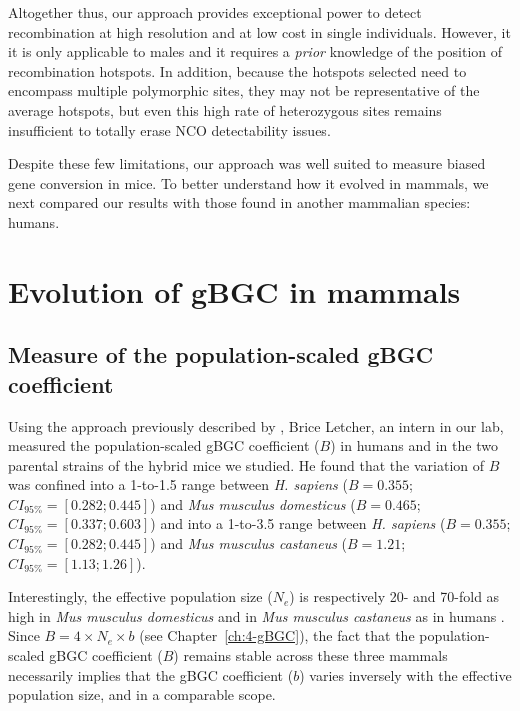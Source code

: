 Altogether thus, our approach provides exceptional power to detect recombination at high resolution and at low cost in single individuals.
However, it it is only applicable to males and it requires a \textit{prior} knowledge of the position of recombination hotspots.
In addition, because the hotspots selected need to encompass multiple polymorphic sites, they may not be representative of the average hotspots, but even this high rate of heterozygous sites remains insufficient to totally erase NCO detectability issues.

Despite these few limitations, our approach was well suited to measure biased gene conversion in mice. 
To better understand how it evolved in mammals, we next compared our results with those found in another mammalian species: humans.


\section{Evolution of gBGC in mammals}
\subsection{Measure of the population-scaled gBGC coefficient}

Using the approach previously described by \citet{glemin2015quantification}, Brice Letcher, an intern in our lab, measured the population-scaled gBGC coefficient ($B$) in humans and in the two parental strains of the hybrid mice we studied.
He found that the variation of $B$ was confined into a 1-to-1.5 range between \textit{H. sapiens} (${B = 0.355}$; ${CI_{95\%} = [0.282; 0.445]}$) and \textit{Mus musculus domesticus} (${B = 0.465}$; ${CI_{95\%} = [0.337; 0.603]}$) and into a 1-to-3.5 range between \textit{H. sapiens} (${B = 0.355}$; ${CI_{95\%} = [0.282; 0.445]}$) and \textit{Mus musculus castaneus} (${B = 1.21}$; ${CI_{95\%} = [1.13; 1.26]}$).

Interestingly, the effective population size ($N_e$) is respectively 20- and 70-fold as high in \textit{Mus musculus domesticus} and in \textit{Mus musculus castaneus} as in humans \citep{charlesworth2009fundamental,phifer-rixey2012adaptive}.
Since $B = 4 \times N_e \times b$ (see Chapter~\ref{ch:4-gBGC}), the fact that the population-scaled gBGC coefficient ($B$) remains stable across these three mammals necessarily implies that the gBGC coefficient ($b$) varies inversely with the effective population size, and in a comparable scope.\\



